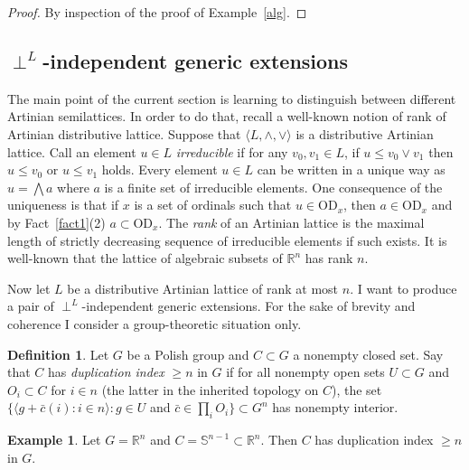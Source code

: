 \documentclass{article}
\newcommand{\vd}{\mathrm{OD}}
\theoremstyle{definition}
\newtheorem{definition}[theorem]{Definition}
\newtheorem{example}[theorem]{Example}
\begin{document}
\begin{proof}
By inspection of the proof of Example~\ref{alg}.
\end{proof}

\subsection{$\perp^L$-independent generic extensions}

The main point of the current section is learning to distinguish between different Artinian semilattices. In order to do that, recall a well-known notion of rank of Artinian distributive lattice. Suppose that $\langle L, \land, \lor\rangle$ is a distributive Artinian lattice. Call an element $u\in L$ \emph{irreducible} if for any $v_0, v_1\in L$, if $u\leq v_0\lor v_1$ then $u\leq v_0$ or $u\leq v_1$ holds. Every element $u\in L$ can be written in a unique way as $u=\bigwedge a$ where $a$ is a finite set of irreducible elements. One consequence of the uniqueness is that if $x$ is a set of ordinals such that $u\in\vd_x$, then $a\in\vd_x$ and by Fact~\ref{fact1}(2) $a\subset\vd_x$. The \emph{rank} of an Artinian lattice is the maximal length of strictly decreasing sequence of irreducible elements if such exists. It is well-known that the lattice of algebraic subsets of $\mathbb{R}^n$ has rank $n$.

Now let $L$ be a distributive Artinian lattice of rank at most $n$. I want to produce a pair of $\perp^L$-independent generic extensions. For the sake of brevity and coherence I consider a group-theoretic situation only.

\begin{definition}
Let $G$ be a Polish group and $C\subset G$ a nonempty closed set. Say that $C$ has \emph{duplication index} $\geq n$ in $G$ if for all nonempty open sets $U\subset G$ and $O_i\subset C$ for $i\in n$ (the latter in the inherited topology on $C$), the set $\{\langle g+\bar c(i)\colon i\in n\rangle\colon g\in U$ and $\bar c\in\prod_iO_i\}\subset G^n$ has nonempty interior.
\end{definition}

\begin{example}
\label{aa}
Let $G=\mathbb{R}^n$ and $C=\mathbb{S}^{n-1}\subset\mathbb{R}^n$. Then $C$ has duplication index $\geq n$ in $G$.
\end{example}
\end{document}
